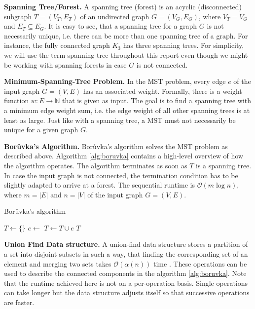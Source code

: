 \documentclass[letterpaper]{article}
\newcommand{\N}[0]{\mathbb{N}}
\newcommand{\bigoh}{\mathcal O}
\newcommand{\mypar}[1]{{\bf #1.}}
\begin{document}
\mypar{Spanning Tree/Forest}
A spanning tree (forest) is an acyclic (disconnected) subgraph $T = (V_T, E_T)$ of an undirected graph $G = (V_G, E_G)$,
where $V_T = V_G$ and $E_T \subseteq E_G$. It is easy to see, that a spanning tree for a graph $G$ is not necessarily
unique, i.e. there can be more than one spanning tree of a graph. For instance, the fully connected graph $K_3$ has
three spanning trees. For simplicity, we will use the term spanning tree throughout this report even though we might be
working with spanning forests in case $G$ is not connected.

\mypar{Minimum-Spanning-Tree Problem}
In the MST problem, every edge $e$ of the input graph $G = (V, E)$ has an associated weight. Formally, there is a weight
function $w : E \to \N$ that is given as input. The goal is to find a spanning tree with a minimum edge weight sum, i.e.
the edge weight of all other spanning trees is at least as large. Just like with a spanning tree, a MST must not
necessarily be unique for a given graph $G$.

\mypar{Bor\r{u}vka's Algorithm}
Bor\r{u}vka's algorithm \cite{boruuvka1926jistem, nevsetvril2001otakar} solves the MST problem as described above.
Algorithm \ref{alg:boruvka} contains a high-level overview of how the algorithm operates. The algorithm terminates as
soon as $T$ is a spanning tree. In case the input graph is not connected, the termination condition has to be slightly adapted to
arrive at a forest. The sequential runtime is $\bigoh(m \log n)$, where $m = |E|$ and $n = |V|$ of the input graph $G =
(V, E)$.

\begin{algorithm}[!t]
  \caption{Bor\r{u}vka's algorithm}
  \label{alg:boruvka}
  \begin{algorithmic}
    \State $T \gets \{ \}$
        \State $e \gets$ 
        \State $T \gets T \cup e$
      \EndFor
      \State {}
    \EndWhile
    \State \Return $T$
  \end{algorithmic}
\end{algorithm}

\mypar{Union Find Data structure}
A union-find data structure stores a partition of a set into disjoint subsets in such a way, that finding the
corresponding set of an element and merging two sets takes $\bigoh(\alpha(n))$ time \cite{efficiency_union_find}. These
operations can be used to describe the connected components in the algorithm \ref{alg:boruvka}. Note that the runtime
achieved here is not on a per-operation basis. Single operations can take longer but the data structure adjusts itself
so that successive operations are faster.
\end{document}
